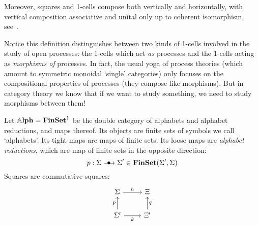 Moreover, squares and 1-cells compose both vertically and horizontally, with vertical composition associative and unital only up to coherent isomorphism, see~\cite{grandis_higher_2019}.

Notice this definition distinguishes between two kinds of 1-cells involved in the study of open processes: the 1-cells which act \emph{as} processes and the 1-cells acting as \emph{morphisms of} processes.
In fact, the usual yoga of process theories (which amount to symmetric monoidal `single' categories) only focuses on the compositional properties of processes (they compose like morphisms).
But in category theory we know that if we want to study something, we need to study morphisms between them!

\begin{example}[Alphabets]
\label{ex:alphabets}
	Let $\Alph = \FinSet^\uparrow$ be the double category of alphabets and alphabet reductions, and maps thereof.
	Its objects are finite sets of symbols we call `alphabets'.
	Its tight maps are maps of finite sets.
	Its loose maps are \emph{alphabet reductions}, which are map of finite sets in the opposite direction:
	\begin{equation}
		p : \Sigma \verto \Sigma' \in \FinSet(\Sigma', \Sigma)
	\end{equation}
	Squares are commutative squares:
	\begin{equation}
		\begin{tikzcd}[ampersand replacement=\&]
			\Sigma \& \Xi \\
			{\Sigma'} \& {\Xi'}
			\arrow["p", from=2-1, to=1-1]
			\arrow["q"', from=2-2, to=1-2]
			\arrow["h", from=1-1, to=1-2]
			\arrow["k"', from=2-1, to=2-2]
		\end{tikzcd}
	\end{equation}
\end{example}

